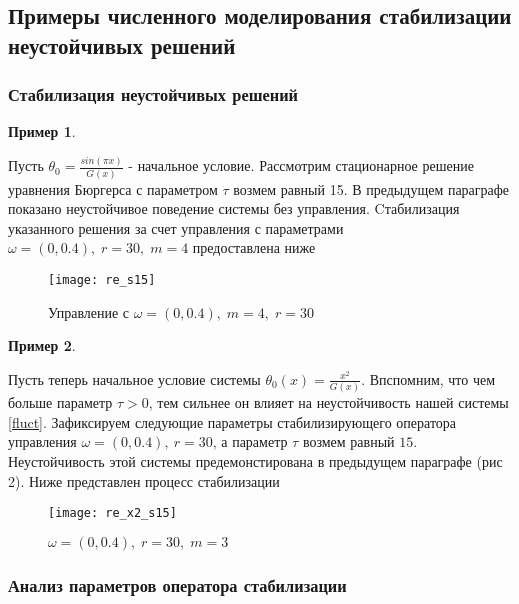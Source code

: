 \subsection{Примеры численного моделирования стабилизации неустойчивых решений}
\vspace{1em}

\subsubsection{Стабилизация неустойчивых решений}

\newtheorem{exmp_stbur}{Пример}

\begin{exmp_stbur}
\end{exmp_stbur}

Пусть $\theta_0 = \frac{sin(\pi x)}{G(x)}$ - начальное условие. Рассмотрим
стационарное решение уравнения Бюргерса с параметром $\tau$ возмем равный 15. 
В предыдущем параграфе показано неустойчивое поведение системы без управления. 
Cтабилизация указанного решения за счет управления с параметрами 
$\omega = (0, 0.4), \; r = 30, \; m = 4$ предоставлена ниже


\begin{figure}[H]
  \centering
  \texttt{[image: re\_s15]}
  \caption{Управление с $\omega = (0, 0.4), \; m = 4, \; r = 30$}
  \label{fig:test2}
\end{figure}


\begin{exmp_stbur}
\end{exmp_stbur}
Пусть теперь начальное условие системы $\theta_0(x) = \frac{x^2}{G(x)}$.
Впспомним, что чем больше параметр $\tau > 0$, тем сильнее он влияет на
неустойчивость нашей системы \eqref{fluct}. Зафиксируем следующие параметры
стабилизирующего оператора управления $\omega = (0, 0.4), \ r = 30$, а параметр 
$\tau$  возмем равный $15$. Неустойчивость этой системы предемонстирована в
предыдущем параграфе (рис 2). Ниже представлен процесс стабилизации

\begin{figure}[H]
 \centering
  \texttt{[image: re\_x2\_s15]}
  \caption{$\omega = (0, 0.4), \; r = 30, \; m = 3$}
  \label{fig:test2}
\end{figure}

\subsubsection{Анализ параметров оператора стабилизации}
\vspace{1em}

